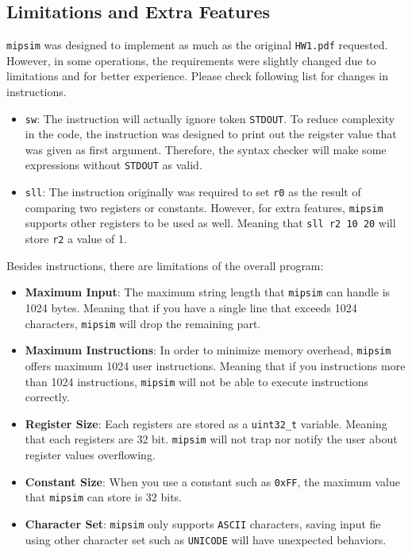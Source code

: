 \documentclass{homework}
\begin{document}
\subsection{Limitations and Extra Features}
\texttt{mipsim} was designed to implement as much as the original \texttt{HW1.pdf} requested. However, in some operations, the requirements were slightly changed due to limitations and for better experience. Please check following list for changes in instructions.
\begin{itemize}
    \item \texttt{sw}: The instruction will actually ignore token \texttt{STDOUT}. To reduce complexity in the code, the instruction was designed to print out the reigster value that was given as first argument. Therefore, the syntax checker will make some expressions without \texttt{STDOUT} as valid. 
    \item \texttt{sll}: The instruction originally was required to set \texttt{r0} as the result of comparing two registers or constants. However, for extra features, \texttt{mipsim} supports other registers to be used as well. Meaning that \texttt{sll r2 10 20} will store \texttt{r2} a value of 1. 
\end{itemize}
Besides instructions, there are limitations of the overall program:
\begin{itemize}
    \item \textbf{Maximum Input}: The maximum string length that \texttt{mipsim} can handle is 1024 bytes. Meaning that if you have a single line that exceeds 1024 characters, \texttt{mipsim} will drop the remaining part. 
    \item \textbf{Maximum Instructions}: In order to minimize memory overhead, \texttt{mipsim} offers maximum 1024 user instructions. Meaning that if you instructions more than 1024 instructions, \texttt{mipsim} will not be able to execute instructions correctly.
    \item \textbf{Register Size}: Each registers are stored as a \texttt{uint32_t} variable. Meaning that each registers are 32 bit. \texttt{mipsim} will not trap nor notify the user about register values overflowing.
    \item \textbf{Constant Size}: When you use a constant such as \texttt{0xFF}, the maximum value that \texttt{mipsim} can store is 32 bits. 
    \item \textbf{Character Set}: \texttt{mipsim} only supports \texttt{ASCII} characters, saving input fie using other character set such as \texttt{UNICODE} will have unexpected behaviors.
\end{itemize}
\end{document}
